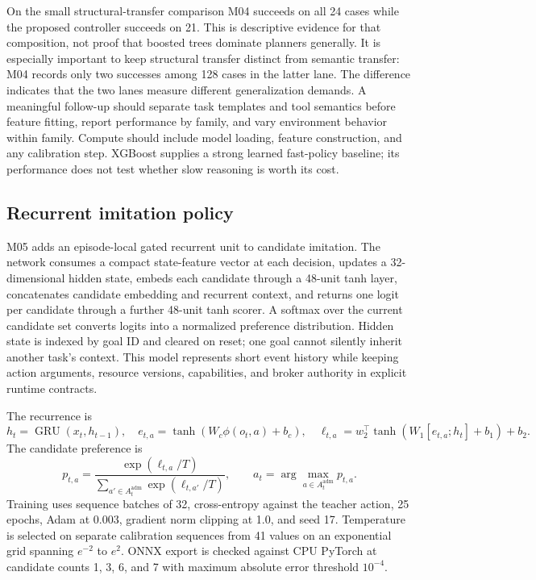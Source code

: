 On the small structural-transfer comparison M04 succeeds on all 24 cases while the proposed controller succeeds on 21. This is descriptive evidence for that composition, not proof that boosted trees dominate planners generally. It is especially important to keep structural transfer distinct from semantic transfer: M04 records only two successes among 128 cases in the latter lane. The difference indicates that the two lanes measure different generalization demands. A meaningful follow-up should separate task templates and tool semantics before feature fitting, report performance by family, and vary environment behavior within family. Compute should include model loading, feature construction, and any calibration step. XGBoost supplies a strong learned fast-policy baseline; its performance does not test whether slow reasoning is worth its cost.

\subsection{Recurrent imitation policy}\label{sec:method-m05}
M05 adds an episode-local gated recurrent unit to candidate imitation. The network consumes a compact state-feature vector at each decision, updates a 32-dimensional hidden state, embeds each candidate through a 48-unit tanh layer, concatenates candidate embedding and recurrent context, and returns one logit per candidate through a further 48-unit tanh scorer. A softmax over the current candidate set converts logits into a normalized preference distribution. Hidden state is indexed by goal ID and cleared on reset; one goal cannot silently inherit another task's context. This model represents short event history while keeping action arguments, resource versions, capabilities, and broker authority in explicit runtime contracts.

The recurrence is
\begin{equation}
h_t=\operatorname{GRU}(x_t,h_{t-1}),\quad e_{t,a}=\tanh(W_c\phi(o_t,a)+b_c),\quad
\ell_{t,a}=w_2^\top\tanh(W_1[e_{t,a};h_t]+b_1)+b_2.
\end{equation}
The candidate preference is
\begin{equation}
p_{t,a}=\frac{\exp(\ell_{t,a}/T)}{\sum_{a'\in A_t^{\mathrm{adm}}}\exp(\ell_{t,a'}/T)},\qquad
a_t=\arg\max_{a\in A_t^{\mathrm{adm}}}p_{t,a}.
\end{equation}
Training uses sequence batches of 32, cross-entropy against the teacher action, 25 epochs, Adam at $0.003$, gradient norm clipping at 1.0, and seed 17. Temperature is selected on separate calibration sequences from 41 values on an exponential grid spanning $e^{-2}$ to $e^2$. ONNX export is checked against CPU PyTorch at candidate counts 1, 3, 6, and 7 with maximum absolute error threshold $10^{-4}$.

